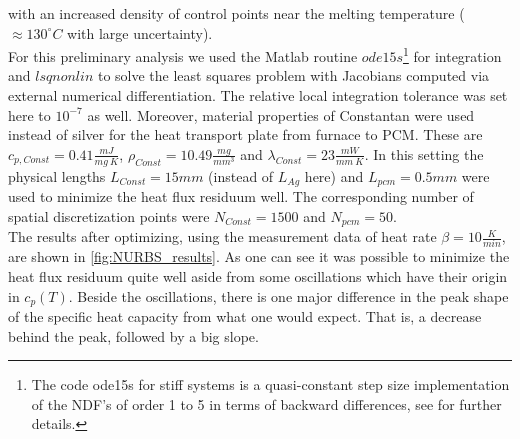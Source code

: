 \documentclass{scrartcl}[12pt, halfparskip]
\numberwithin{equation}{section}
\numberwithin{figure}{section}
\numberwithin{table}{section}
\begin{document}
with an increased density of control points near the melting temperature ($\approx 130^{\circ}C$ with large uncertainty). \\
For this preliminary analysis we used the Matlab routine $ode15s$\footnote{The code ode15s for stiff systems is a quasi-constant step size implementation of the NDF’s of order 1 to 5 in terms of backward differences, see \cite{matlab_ode_suite} for further details.} for integration and $lsqnonlin$ to solve the least squares problem with Jacobians computed via external numerical differentiation. 
The relative local integration tolerance was set here to $10^{-7}$ as well. Moreover, material properties of Constantan were used instead of silver for the heat transport plate from furnace to PCM. These are $c_{p,Const}=0.41\frac{mJ}{mg \ K}$, $\rho_{Const}=10.49\frac{mg}{mm^3}$ and $\lambda_{Const}=23\frac{mW}{mm \ K}$. 
In this setting the physical lengths $L_{Const}=15mm$ (instead of $L_{Ag}$ here) and $L_{pcm}=0.5mm$ were used to minimize the heat flux residuum well. The corresponding number of spatial discretization points were $N_{Const}=1500$ and $N_{pcm}=50$. \\
The results after optimizing, using the measurement data of heat rate $\beta = 10 \frac{K}{min}$, are shown in \cref{fig:NURBS_results}. As one can see it was possible to minimize the heat flux residuum quite well aside from some oscillations which have their origin in $c_p(T)$. 
Beside the oscillations, there is one major difference in the peak shape of the specific heat capacity from what one would expect. That is, a decrease behind the peak, followed by a big slope. \\
\end{document}
